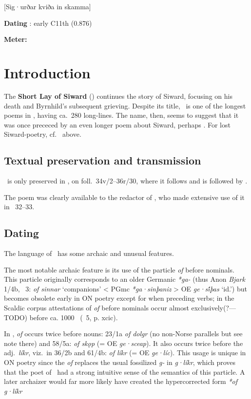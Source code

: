[Sig·urðar kviða in skamma]

\begin{flushright}%
\textbf{Dating} \parencite{Sapp2022}: early C11th (0.876)

\textbf{Meter:} \Fornyrdislag%
\end{flushright}

\section{Introduction}

The \textbf{Short Lay of Siward} (\Sigurdskamma) continues the story of Siward, focusing on his death and Byrnhild’s subsequent grieving.  Despite its title, \Sigurdskamma\ is one of the longest poems in \Regius, having ca.~280 long-lines.  The name, then, seems to suggest that it was once prececed by an even longer poem about Siward, perhaps .  For lost Siward-poetry, cf.~ above.

\subsection{Textual preservation and transmission}

\Sigurdskamma\ is only preserved in \Regius, on foll.~34v/2--36r/30, where it follows  and is followed by .

The poem was clearly available to the redactor of \VolsungaSaga, who made extensive use of it in \VolsungaSaga\ 32--33.

\subsection{Dating}

The language of \Sigurdskamma\ has some archaic and unusual features.

The most notable archaic feature is its use of the particle \emph{of} before nominals.  This particle originally corresponds to an older Germanic \emph{*ga-} (thus Anon \emph{Bjark} 1/4b, \Skp\ 3: \emph{of sinnar} ‘companions’ < PGmc \emph{*ga·sinþaniz} > OE \emph{ge·si̇́þas} ‘id.’) but becomes obsolete early in ON poetry except for when preceding verbs; in the Scaldic corpus attestations of \emph{of} before nominals occur almost exclusively(?---TODO) before ca. 1000 \ce\ (\Skp\ 5, p. xcic).

In \Sigurdskamma, \emph{of} occurs twice before nouns: 23/1a \emph{of dolgr} (no non-Norse parallels but see note there) and 58/5a: \emph{of skǫp} (= OE \emph{ge·sceap}).  It also occurs twice before the adj.~\emph{líkr}, viz.~in 36/2b and 61/4b: \emph{of líkr} (= OE \emph{ge·líc}).  This usage is unique in ON poetry since the \emph{of} replaces the usual fossilized \emph{g-} in \emph{g·líkr}, which proves that the poet of \Sigurdskamma\ had a strong intuitive sense of the semantics of this particle.  A later archaizer would far more likely have created the hypercorrected form \emph{*of g·líkr}

